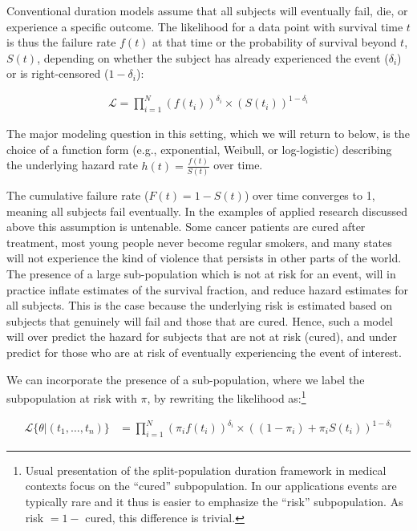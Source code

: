 \documentclass[article]{jss}
\begin{document}
Conventional duration models assume that all subjects will eventually
fail, die, or experience a specific outcome. The likelihood for a data
point with survival time \(t\) is thus the failure rate \(f(t)\) at that
time or the probability of survival beyond \(t\), \(S(t)\), depending on
whether the subject has already experienced the event (\(\delta_i\)) or
is right-censored (\(1-\delta_i\)):

\begin{eqnarray}
\mathcal{L} = \prod_{i=1}^N  \left( f(t_i)\right)^{\delta_i} \times \left( S(t_i) \right)^{1-\delta_i}
\end{eqnarray}

The major modeling question in this setting, which we will return to
below, is the choice of a function form (e.g., exponential, Weibull, or
log-logistic) describing the underlying hazard rate
\(h(t) = \frac{f(t)}{S(t)}\) over time.

The cumulative failure rate (\(F(t) = 1 - S(t)\)) over time converges to
1, meaning all subjects fail eventually. In the examples of applied
research discussed above this assumption is untenable. Some cancer
patients are cured after treatment, most young people never become
regular smokers, and many states will not experience the kind of
violence that persists in other parts of the world. The presence of a
large sub-population which is not at risk for an event, will in practice
inflate estimates of the survival fraction, and reduce hazard estimates
for all subjects. This is the case because the underlying risk is
estimated based on subjects that genuinely will fail and those that are
cured. Hence, such a model will over predict the hazard for subjects
that are not at risk (cured), and under predict for those who are at
risk of eventually experiencing the event of interest.

We can incorporate the presence of a sub-population, where we label the
subpopulation at risk with \(\pi\), by rewriting the likelihood
as:\footnote{Usual presentation of the split-population duration framework in medical contexts focus on the ``cured'' subpopulation. In our applications events are typically rare and it thus is easier to emphasize the ``risk'' subpopulation. As risk $= 1 - $ cured, this difference is trivial.}

\begin{align}
\mathcal{L}\{\theta|(t_{1}, \dots, t_{n})\} &= \prod_{i=1}^{N} \left(\pi_i f(t_i)\right)^{\delta_i} \times  \left((1-\pi_i) + \pi_i S(t_i)\right)^{1-\delta_i}
\end{align}
\end{document}
